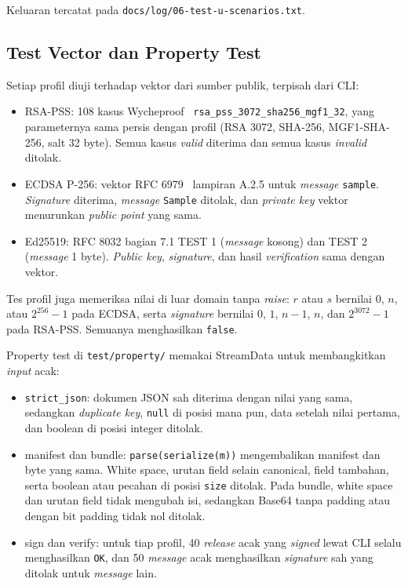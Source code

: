 Keluaran tercatat pada \texttt{docs/log/06-test-u-scenarios.txt}.

\subsection{Test Vector dan Property Test}

Setiap profil diuji terhadap vektor dari sumber publik, terpisah dari CLI:

\begin{itemize}
  \item RSA-PSS: 108 kasus Wycheproof~\cite{wycheproof} \texttt{rsa\_pss\_3072\_sha256\_mgf1\_32}, yang
    parameternya sama persis dengan profil (RSA 3072, SHA-256, MGF1-SHA-256, salt 32 byte).
    Semua kasus \textit{valid} diterima dan semua kasus \textit{invalid} ditolak.
  \item ECDSA P-256: vektor RFC 6979~\cite{rfc6979} lampiran A.2.5 untuk \textit{message} \texttt{sample}. \textit{Signature} diterima, \textit{message} \texttt{Sample} ditolak, dan \textit{private key} vektor menurunkan
    \textit{public point} yang sama.
  \item Ed25519: RFC 8032 bagian 7.1 TEST 1 (\textit{message} kosong) dan TEST 2 (\textit{message} 1 byte).
    \textit{Public key}, \textit{signature}, dan hasil \textit{verification} sama dengan vektor.
\end{itemize}

Tes profil juga memeriksa nilai di luar domain tanpa \textit{raise}: $r$ atau $s$ bernilai
$0$, $n$, atau $2^{256}-1$ pada ECDSA, serta \textit{signature} bernilai $0$, $1$, $n-1$, $n$,
dan $2^{3072}-1$ pada RSA-PSS. Semuanya menghasilkan \texttt{false}.

Property test di \texttt{test/property/} memakai StreamData untuk membangkitkan \textit{input}
acak:

\begin{itemize}
  \item \texttt{strict\_json}: dokumen JSON sah diterima dengan nilai yang sama, sedangkan
    \textit{duplicate key}, \texttt{null} di posisi mana pun, data setelah nilai pertama,
    dan boolean di posisi integer ditolak.
  \item manifest dan bundle: \texttt{parse(serialize(m))} mengembalikan manifest dan byte
    yang sama. White space, urutan field selain canonical, field tambahan, serta boolean
    atau pecahan di posisi \texttt{size} ditolak. Pada bundle, white space dan urutan field
    tidak mengubah isi, sedangkan Base64 tanpa padding atau dengan bit padding tidak nol
    ditolak.
  \item sign dan verify: untuk tiap profil, 40 \textit{release} acak yang \textit{signed} lewat CLI
    selalu menghasilkan \texttt{OK}, dan 50 \textit{message} acak menghasilkan \textit{signature} sah yang
    ditolak untuk \textit{message} lain.
\end{itemize}

